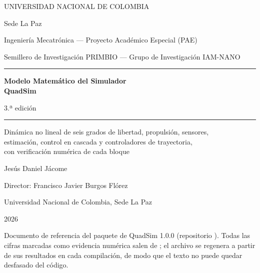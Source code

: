 \begin{titlepage}
\thispagestyle{empty}
\centering
\vspace*{1.2cm}
{\large UNIVERSIDAD NACIONAL DE COLOMBIA\par}
{\large Sede La Paz\par}
\vspace{0.3cm}
{\normalsize Ingeniería Mecatrónica --- Proyecto Académico Especial (PAE)\par}
{\normalsize Semillero de Investigación PRIMBIO --- Grupo de Investigación IAM-NANO\par}
\vspace{2.6cm}
{\color{azul}\rule{0.85\textwidth}{1.2pt}\par}
\vspace{0.5cm}
{\Huge\bfseries Modelo Matemático del Simulador\\[0.25cm] QuadSim\par}
\vspace{0.4cm}
{\LARGE 3.ª edición\par}
\vspace{0.4cm}
{\color{azul}\rule{0.85\textwidth}{1.2pt}\par}
\vspace{1.2cm}
{\large Dinámica no lineal de seis grados de libertad, propulsión, sensores,\\
estimación, control en cascada y controladores de trayectoria,\\
con verificación numérica de cada bloque\par}
\vfill
{\Large Jesús Daniel Jácome\par}
\vspace{0.25cm}
{\large Director: Francisco Javier Burgos Flórez\par}
\vspace{0.6cm}
{\large Universidad Nacional de Colombia, Sede La Paz\par}
{\large 2026\par}
\vspace{1.2cm}
\begin{minipage}{0.86\textwidth}\small\color{tinta2}
Documento de referencia del paquete  de QuadSim 1.0.0
(repositorio ). Todas las cifras marcadas como evidencia numérica
salen de ; el archivo
 se regenera a partir de sus resultados en cada
compilación, de modo que el texto no puede quedar desfasado del código.
\end{minipage}
\end{titlepage}

